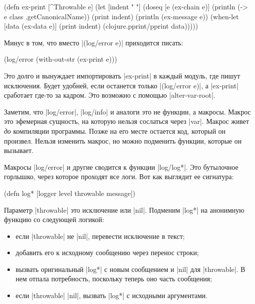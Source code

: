 \begin{english}
  \begin{clojure}
(defn ex-print
  [^Throwable e]
  (let [indent "  "]
    (doseq [e (ex-chain e)]
      (println (-> e class .getCanonicalName))
      (print indent)
      (println (ex-message e))
      (when-let [data (ex-data e)]
        (print indent)
        (clojure.pprint/pprint data)))))
  \end{clojure}
\end{english}

\noindent
Минус в том, что вместо \spverb|(log/error e)| приходится писать:

\begin{english}
  \begin{clojure}
(log/error (with-out-str (ex-print e)))
  \end{clojure}
\end{english}

\noindent
Это долго и вынуждает импортировать \spverb|ex-print| в каждый модуль, где пишут
исключения. Будет удобней, если останется только \spverb|(log/error e)|, а
\spverb|ex-print| сработает где-то за кадром. Это возможно с помощью
\spverb|alter-var-root|.

Заметим, что \spverb|log/error|, \spverb|log/info| и аналоги это не функции, а
макросы. Макрос это эфемерная сущность, на которую нельзя сослаться через
\spverb|var|. Макрос живет \emph{до} компиляции программы. Позже на его месте
остается код, который он произвел. Нельзя изменить макрос, но можно подменить
функции, которые он вызывает.

Макросы \spverb|log/error| и другие сводится к функции \spverb|log/log*|. Это
бутылочное горлышко, через которое проходят все логи. Вот как выглядит ее
сигнатура:

\begin{english}
  \begin{clojure}
(defn log* [logger level throwable message])
  \end{clojure}
\end{english}

Параметр \spverb|throwable| это исключение или \spverb|nil|. Подменим
\spverb|log*| на анонимную функцию со следующей логикой:

\begin{itemize}

\item
  если \spverb|throwable| не \spverb|nil|, перевести исключение в текст;

\item
  добавить его к исходному сообщению через перенос строки;

\item
  вызвать оригинальный \spverb|log*| с новым сообщением и \spverb|nil| для
  \spverb|throwable|. В нем отпала потребность, поскольку теперь оно часть
  сообщения;

\item
  если \spverb|throwable| \spverb|nil|, вызвать \spverb|log*| с исходными
  аргументами.

\end{itemize}

